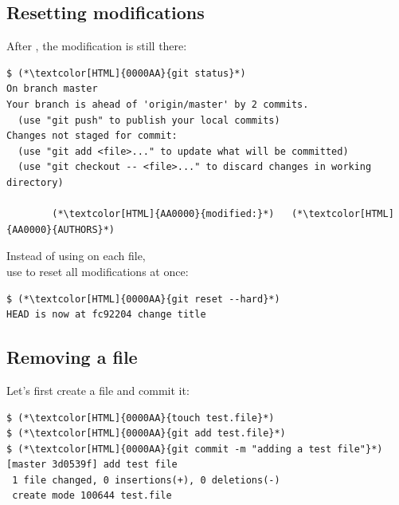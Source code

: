 \subsection{Resetting modifications}
\begin{frame}[fragile]
\subslidetitle
  After , the modification is still there:
\begin{lstlisting}
$ (*\textcolor[HTML]{0000AA}{git status}*)
On branch master
Your branch is ahead of 'origin/master' by 2 commits.
  (use "git push" to publish your local commits)
Changes not staged for commit:
  (use "git add <file>..." to update what will be committed)
  (use "git checkout -- <file>..." to discard changes in working directory)

        (*\textcolor[HTML]{AA0000}{modified:}*)   (*\textcolor[HTML]{AA0000}{AUTHORS}*)
\end{lstlisting}

  Instead of using  on each file, \\
  use  to reset all modifications at once:
\begin{lstlisting}
$ (*\textcolor[HTML]{0000AA}{git reset --hard}*)
HEAD is now at fc92204 change title
\end{lstlisting}
\end{frame}

\subsection{Removing a file}
\begin{frame}[fragile]
\subslidetitle
  Let's first create a file and commit it:
\begin{lstlisting}
$ (*\textcolor[HTML]{0000AA}{touch test.file}*)
$ (*\textcolor[HTML]{0000AA}{git add test.file}*)
$ (*\textcolor[HTML]{0000AA}{git commit -m "adding a test file"}*)
[master 3d0539f] add test file
 1 file changed, 0 insertions(+), 0 deletions(-)
 create mode 100644 test.file
\end{lstlisting}
\end{frame}

